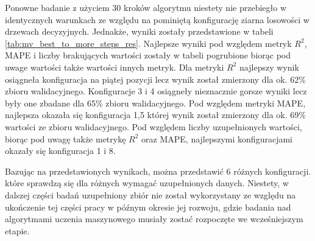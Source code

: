 Ponowne badanie z użyciem 30 kroków algorytmu niestety nie przebiegło w identycznych warunkach ze względu na pominiętą konfigurację ziarna losowości w drzewach decyzyjnych. Jednakże, wyniki zostały przedstawione w tabeli \ref{tab:mv_best_to_more_steps_res}. Najlepsze wyniki pod względem metryk $R^{2}$, MAPE i liczby brakujących wartości zostały w tabeli pogrubione biorąc pod uwage wartości także wartości innych metryk. Dla metryki $R^{2}$ najlepszy wynik osiągneła konfiguracja na piątej pozycji lecz wynik został zmierzony dla ok. 62\% zbioru walidacyjnego. Konfiguracje 3 i 4 osiągneły nieznacznie gorsze wyniki lecz były one zbadane dla 65\% zbioru walidacyjnego. Pod względem metryki MAPE, najlepsza okazała się konfiguracja 1,5 której wynik został zmierzony dla ok. 69\% wartości ze zbioru walidacyjnego. Pod względem liczby uzupełnionych wartości, biorąc pod uwagę także metrykę $R^{2}$ oraz MAPE, najlepszymi konfiguracjami okazały się konfiguracja 1 i 8.

Bazując na przedstawionych wynikach, można przedstawić 6 różnych konfiguracji. które sprawdzą się dla różnych wymagać uzupełnionych danych. Niestety, w dalszej części badań uzupełniony zbiór nie został wykorzystany ze względu na ukończenie tej części pracy w późnym okresie jej rozwoju, gdzie badania nad algorytmami uczenia maszynowego musiały zostać rozpoczęte we wcześniejszym etapie.

